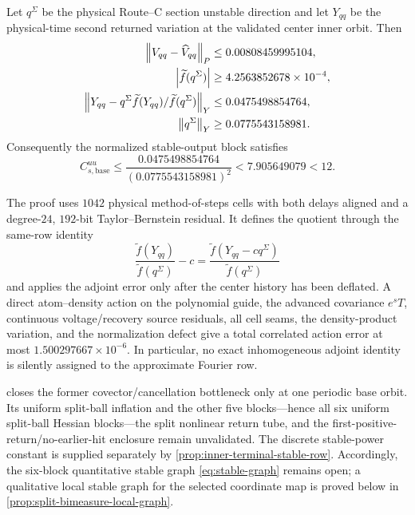 \begin{proposition}\label{prop:base-uu}
Let \(q^\Sigma\) be the physical Route--C section unstable direction and
let \(Y_{qq}\) be the physical-time second returned variation at the
validated center inner orbit.  Then
\begin{align}
 \left\lVert V_{qq}-\widehat V_{qq}\right\rVert_P
   &\le0.00808459995104,\notag\\
 \left\lvert\widetilde f(q^\Sigma)\right\rvert
   &\ge4.2563852678\times10^{-4},\notag\\
 \left\lVert Y_{qq}-q^\Sigma
       \widetilde f(Y_{qq})/\widetilde f(q^\Sigma)\right\rVert_Y
   &\le0.0475498854764,\notag\\
 \left\lVert q^\Sigma\right\rVert_Y&\ge0.0775543158981.                 \label{eq:directed-base-uu}
\end{align}
Consequently the normalized stable-output block satisfies
\begin{equation}
 C^{uu}_{s,\mathrm{base}}
 \le\frac{0.0475498854764}{(0.0775543158981)^2}
 <7.905649079<12.                                     \label{eq:base-uu-bound}
\end{equation}
\end{proposition}

The proof uses \(1042\) physical method-of-steps cells with both delays
aligned and a degree-\(24\), \(192\)-bit Taylor--Bernstein residual.  It
defines the quotient through the same-row identity
\[
 \frac{\widetilde f(Y_{qq})}{\widetilde f(q^\Sigma)}-c
 =\frac{\widetilde f(Y_{qq}-cq^\Sigma)}
        {\widetilde f(q^\Sigma)}
\]
and applies the adjoint error only after the center history has been
deflated.  A direct atom--density action on the polynomial guide, the
advanced covariance \(e^sT\), continuous voltage/recovery source residuals,
all cell seams, the density-product variation, and the normalization defect
give a total correlated action error at most
\(1.500297667\times10^{-6}\).  In particular, no exact inhomogeneous
adjoint identity is silently assigned to the approximate Fourier row.

 closes the former covector/cancellation bottleneck only
at one periodic base orbit.  Its uniform split-ball inflation and the other
five blocks---hence all six uniform split-ball Hessian blocks---the split
nonlinear return tube, and the first-positive-return/no-earlier-hit enclosure
remain unvalidated.  The discrete stable-power constant is supplied separately
by \cref{prop:inner-terminal-stable-row}.  Accordingly, the six-block
quantitative stable graph \cref{eq:stable-graph} remains open; a qualitative
local stable graph for the selected coordinate map is proved below in
\cref{prop:split-bimeasure-local-graph}.

